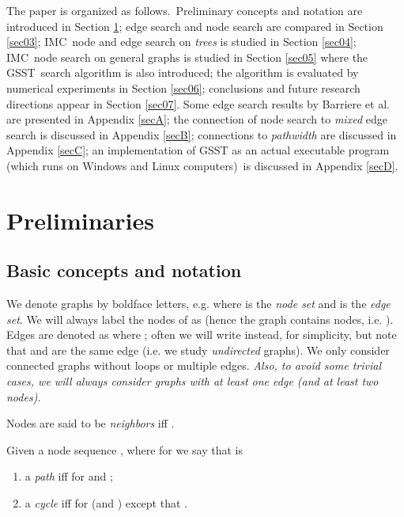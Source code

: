 \documentclass[11pt]{article}\usepackage{amsmath}
\begin{document}
The paper is organized as follows.\ Preliminary concepts and notation are
introduced in Section \ref{sec02}; edge search and node search are compared in
Section \ref{sec03}; IMC\ node and edge search on \emph{trees} is studied in
Section \ref{sec04}; IMC\ node search on general graphs is studied in Section
\ref{sec05} where the GSST\ search algorithm is also introduced; the algorithm
is evaluated by numerical experiments in Section \ref{sec06}; conclusions and
future research directions appear in Section \ref{sec07}. Some edge search
results by Barriere et al. \cite{Barriere1,Barriere2} are presented in
Appendix \ref{secA}; the connection of node search to \emph{mixed} edge search
is discussed in Appendix \ref{secB}; connections to \emph{pathwidth} are
discussed in Appendix \ref{secC}; an implementation of GSST as an actual
executable program (which runs on Windows and Linux computers)\ is discussed
in Appendix \ref{secD}.

\section{Preliminaries}

\label{sec02}

\subsection{Basic concepts and notation}

We denote graphs by boldface letters, e.g. 
where  is the \emph{node set} and  is the \emph{edge set}. We will
always label the nodes of  as 
(hence the graph contains  nodes, i.e. ). Edges
are denoted as  where ; often we will write
 instead, for simplicity, but note that  and  are the same edge
(i.e. we study \emph{undirected} graphs). We only consider connected graphs
without loops or multiple edges. \emph{Also, to avoid some trivial cases, we
will always consider graphs with at least one edge (and at least two nodes).}

Nodes  are said to be \emph{neighbors} iff .

Given a node sequence , where  for 
 we say that  is

\begin{enumerate}
\item a \emph{path} iff  for  and ;

\item a \emph{cycle} iff  for  (and ) except that .
\end{enumerate}
\end{document}
